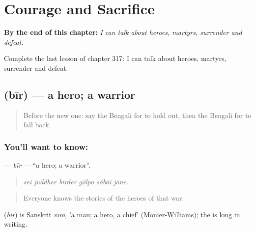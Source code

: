 
\chapter{Courage and Sacrifice}
\label{ch:bn-courage-and-sacrifice}

\begin{chapteropening}
\textbf{By the end of this chapter:} \emph{I can talk about heroes, martyrs, surrender and defeat.}

Complete the last lesson of chapter 317: I can talk about heroes, martyrs, surrender and defeat.
\end{chapteropening}

\section[\texorpdfstring{\bn{বীর} (bīr)}{বীর (bīr)}]{ (bīr) — a hero; a warrior}

\label{lesson:BN-C317-bir}



\begin{quote}
Before the new one: say the Bengali for to hold out, then the Bengali for to fall back.
\end{quote}

\subsection*{You'll want to know: }
\textbf{} — \emph{bīr} — \textquotedblleft{}a hero; a warrior\textquotedblright{}.

\begin{quote}
     
\end{quote}

\begin{quote}
\emph{sei juddher bīrder gôlpo sôbāi jāne.}
\end{quote}

\begin{quote}
Everyone knows the stories of the heroes of that war.
\end{quote}

\begin{cousinweb}
\textbf{} (\emph{bīr}) is Sanskrit \emph{vīra}, 'a man; a hero, a chief' (Monier-Williams); the  is long in writing.
\end{cousinweb}

